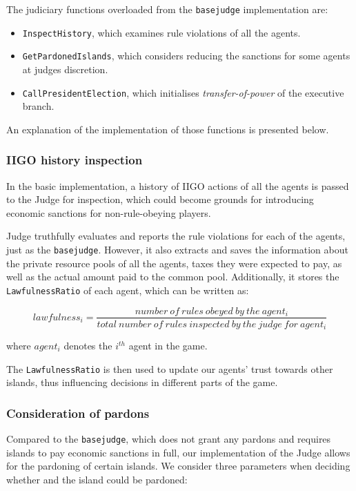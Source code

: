 The judiciary functions overloaded from the \texttt{basejudge} implementation are:
\begin{itemize}
    \item \texttt{InspectHistory}, which examines rule violations of all the agents.
    \item \texttt{GetPardonedIslands}, which considers reducing the sanctions for some agents at judges discretion.
    \item \texttt{CallPresidentElection}, which initialises \emph{transfer-of-power} of the executive branch.
\end{itemize}
An explanation of the implementation of those functions is presented below.

\subsubsection{IIGO history inspection}
\label{subsubsec:team4:judge:inspect_history}
In the basic implementation, a history of IIGO actions of all the agents is passed to the Judge for inspection, which could become grounds for introducing economic sanctions for non-rule-obeying players. 

Judge truthfully evaluates and reports the rule violations for each of the agents, just as the \texttt{basejudge}. However, it also extracts and saves the information about the private resource pools of all the agents, taxes they were expected to pay, as well as the actual amount paid to the common pool. Additionally, it stores the \texttt{LawfulnessRatio} of each agent, which can be written as:


\begin{equation}
    lawfulness_{i} = \frac{number\:of\:rules\:obeyed\:by\:the\:agent_{i}}{total\:number\:of\:rules\:inspected\:by\:the\:judge\:for\:agent_{i}}
\end{equation}

where $agent_{i}$ denotes the $i^{th}$ agent in the game.  

The \texttt{LawfulnessRatio} is then used to update our agents' trust towards other islands, thus influencing decisions in different parts of the game. 

\subsubsection{Consideration of pardons}
Compared to the \texttt{basejudge}, which does not grant any pardons and requires islands to pay economic sanctions in full, our implementation of the Judge allows for the pardoning of certain islands. We consider three parameters when deciding whether and the island could be pardoned:

